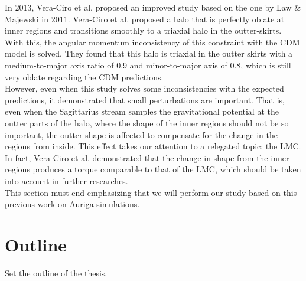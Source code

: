 In 2013, Vera-Ciro et al. proposed an improved study based on the one by Law \& Majewski in 2011. Vera-Ciro et al. proposed a halo that is perfectly oblate at inner regions and transitions smoothly to a triaxial halo in the outter-skirts. With this, the angular momentum inconsistency of this constraint with the CDM model is solved. They found that this halo is triaxial in the outter skirts with a medium-to-major axis ratio of $0.9$ and minor-to-major axis of $0.8$, which is still very oblate regarding the CDM predictions.\\

However, even when this study solves some inconsistencies with the expected predictions, it demonstrated that small perturbations are important. That is, even when the Sagittarius stream samples the gravitational potential at the outter parts of the halo, where the shape of the inner regions should not be so important, the outter shape is affected to compensate for the change in the regions from inside. This effect takes our attention to a relegated topic: the LMC. In fact, Vera-Ciro et al. demonstrated that the change in shape from the inner regions produces a torque comparable to that of the LMC, which should be taken into account in further researches.\\



%

This section must end emphasizing that we will perform our study based on this previous work on Auriga simulations.

\section{Outline}

Set the outline of the thesis.
